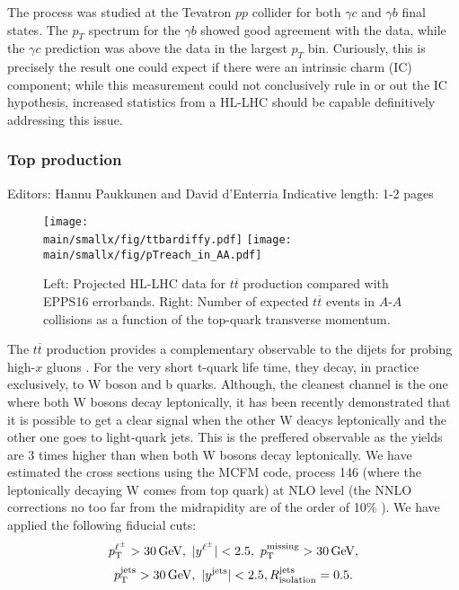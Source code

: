 \documentclass[../report.tex]{subfiles}
\providecommand{\main}{..}
\begin{document}
The process was studied at the Tevatron $pp$ collider 
for both $\gamma c$ and $\gamma b$ final states. 
The $p_T$ spectrum for the $\gamma b$ showed good agreement 
with the data, while the  $\gamma c$ prediction was above the data in the largest $p_T$ bin. 
Curiously, this is precisely the result one could expect  if there were an intrinsic charm (IC)
component; while this measurement could not conclusively rule  in or out  the IC hypothesis, 
increased statistics from a HL-LHC should be capable  definitively addressing this issue. 









\subsubsection{Top production}
Editors: Hannu Paukkunen and David d'Enterria
Indicative length: 1-2 pages \\

\begin{figure}[htb!]
\centering
\texttt{[image: \\main/smallx/fig/ttbardiffy.pdf]}
\texttt{[image: \\main/smallx/fig/pTreach\_in\_AA.pdf]}
\caption{Left: Projected HL-LHC data for $t\overline{t}$ production compared with EPPS16 errorbands. Right: Number of expected $t\overline{t}$ events in $A$-$A$ collisions as a function of the top-quark transverse momentum.}
\label{fig:ttbardiffy}
\end{figure}

The $t\overline{t}$ production provides a complementary observable to the dijets for probing high-$x$ gluons \cite{dEnterria:2015mgr}. For the very short t-quark life time, they decay, in practice exclusively, to W boson and b quarks. Although, the cleanest channel is the one where both W bosons decay leptonically, it has been recently demonstrated \cite{Sirunyan:2017xku} that it is possible to get a clear signal when the other W deacys leptonically and the other one goes to light-quark jets. This is the preffered observable as the yields are 3 times higher than when both W bosons decay leptonically. We have estimated the cross sections using the MCFM code, process 146 (where the leptonically decaying W comes from top quark) at NLO level (the NNLO corrections no too far from the midrapidity are of the order of 10\% \cite{}). We have applied the following fiducial cuts:
$$ p_{\rm T}^{\ell^\pm} > 30 \, {\rm GeV}, \ |y^{\ell^\pm}| < 2.5, \ p_{\rm T}^{\rm missing} > 30 \, {\rm GeV}, $$
$$ p_{\rm T}^{\rm jets} > 30 \, {\rm GeV}, \ |y^{\rm jets}| < 2.5, R_{\rm isolation}^{\rm jets} = 0.5. $$
\end{document}
